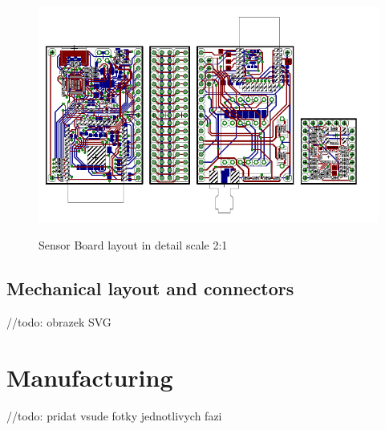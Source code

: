 \begin{figure}
	\centering
	\includegraphics[angle=90, scale=2]{img/brd.pdf}
	\label{brd2}
	\caption{Sensor Board layout in detail scale 2:1}
\end{figure}

\subsection{Mechanical layout and connectors}
//todo: obrazek SVG

\section{Manufacturing}
\label{HWmanufacturing}
//todo: pridat vsude fotky jednotlivych fazi

